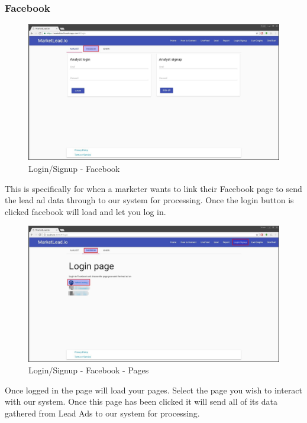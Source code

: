 \documentclass{article}
\begin{document}
			\subsubsection{Facebook}
				\begin{figure}[H]
					\includegraphics[width=\textwidth]{images/login_signup_facebook.jpg}
					\caption{Login/Signup - Facebook}
				\end{figure}
				This is specifically for when a marketer wants to link their Facebook page to send the lead ad data through to our system for processing.
				Once the login button is clicked facebook will load and let you log in.

				\begin{figure}[H]
					\includegraphics[width=\textwidth]{images/login_signup_facebook_pages.jpg}
					\caption{Login/Signup - Facebook - Pages}
				\end{figure}
				Once logged in the page will load your pages. Select the page you wish to interact with our system.
				Once this page has been clicked it will send all of its data gathered from Lead Ads to our system for processing.
\end{document}
